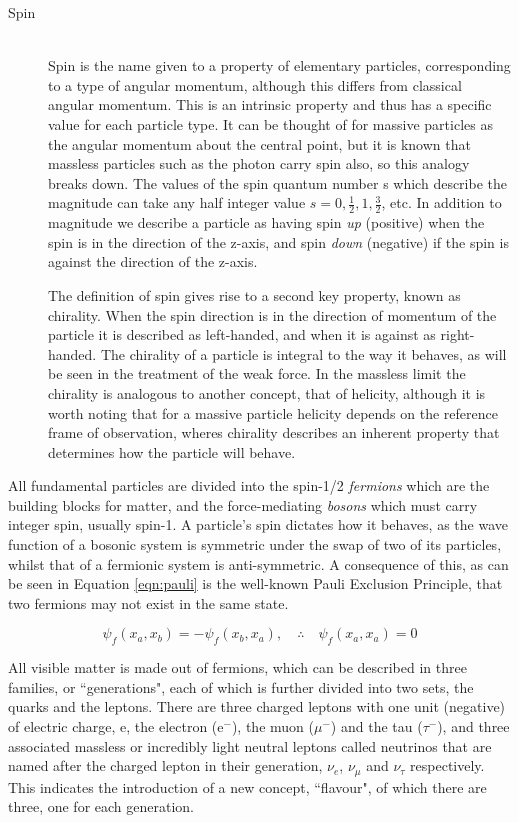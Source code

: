 \begin{description}
\item[Spin] \hfill \\
Spin is the name given to a property of elementary particles, corresponding to a type of angular momentum, although this differs from classical angular momentum. This is an intrinsic property and thus has a specific value for each particle type. It can be thought of for massive particles as the angular momentum about the central point, but it is known that massless particles such as the photon carry spin also, so this analogy breaks down. The values of the spin quantum number s which describe the magnitude can take any half integer value $s=0, \frac{1}{2}, 1, \frac{3}{2}$, etc. In addition to magnitude we describe a particle as having spin \textit{up} (positive) when the spin is in the direction of the z-axis, and spin \textit{down} (negative) if the spin is against the direction of the z-axis. 

The definition of spin gives rise to a second key property, known as chirality. When the spin direction is in the direction of momentum of the particle it is described as left-handed, and when it is against as right-handed. The chirality of a particle is integral to the way it behaves, as will be seen in the treatment of the weak force. In the massless limit  the chirality is analogous to another concept, that of helicity, although it is worth noting that for a massive particle helicity depends on the reference frame of observation, wheres chirality describes an inherent property that determines how the particle will behave.
\end{description}
All fundamental particles are divided into the spin-1/2 \textit{fermions} which are the building blocks for matter, and the force-mediating \textit{bosons} which must carry integer spin, usually spin-1.  A particle's spin dictates how it behaves, as the wave function of a bosonic system is symmetric under the swap of two of its particles, whilst that of a fermionic system is anti-symmetric. A consequence of this, as can be seen in Equation \ref{eqn:pauli} is the well-known Pauli Exclusion Principle, that two fermions may not exist in the same state. 

\begin{equation}
\psi_{f}(x_{a},x_{b}) = -\psi_{f}(x_{b},x_{a}), \quad \therefore \quad \psi_{f}(x_{a},x_{a}) = 0
\label{eqn:pauli}
\end{equation}
 

All visible matter is made out of fermions, which can be described in three families, or ``generations", each of which is further divided into two sets, the quarks and the leptons. There are three charged leptons with one unit (negative) of electric charge, e, the electron (e$^{-}$), the muon ($\mu^{-}$) and the tau ($\tau^{-}$), and three associated massless or incredibly light  neutral leptons called neutrinos that are named after the charged lepton in their generation, $\nu_{e}$, $\nu_{\mu}$ and $ \nu_{\tau}$ respectively. This indicates the introduction of a new concept, ``flavour", of which there are three, one for each generation. 


